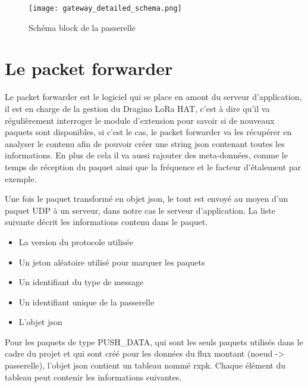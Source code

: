 \begin{figure}[htb]
\centering 
\texttt{[image: gateway\_detailed\_schema.png]} 
\caption{Schéma block de la passerelle}
\label{fig:gateway_schema}
\end{figure}


\section{Le packet forwarder}

Le packet forwarder est le logiciel qui se place en amont du serveur d'application, il est en charge de la gestion du Dragino LoRa HAT, c'est à dire qu'il va régulièrement interroger le module d'extension pour savoir si de nouveaux paquets sont disponibles, si c'est le cas, le packet forwarder va les récupérer en analyser le contenu afin de pouvoir créer une string json contenant toutes les informations. En plus de cela il va aussi rajouter des meta-données, comme le temps de réception du paquet ainsi que la fréquence et le facteur d'étalement par exemple.

Une fois le paquet transformé en objet json, le tout est envoyé au moyen d'un paquet UDP à un serveur, dans notre cas le serveur d'application. La liste suivante décrit les informations contenu dans le paquet.

\begin{itemize}
\item La version du protocole utilisée
\item Un jeton aléatoire utilisé pour marquer les paquets
\item Un identifiant du type de message
\item Un identifiant unique de la passerelle
\item L'objet json
\end{itemize}

Pour les paquets de type PUSH\_DATA, qui sont les seuls paquets utilisés dans le cadre du projet et qui sont créé pour les données du flux montant (noeud -> passerelle), l'objet json contient un tableau nommé rxpk. Chaque élément du tableau peut contenir les informations suivantes.

